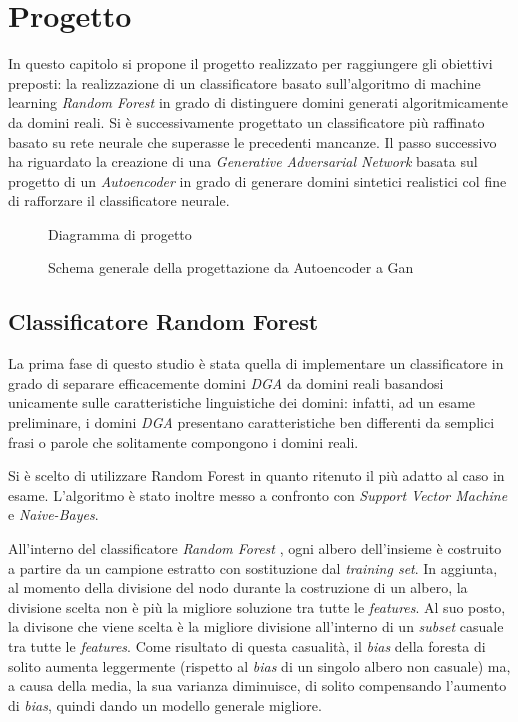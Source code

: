 \chapter{Progetto}
\label{progetto}

In questo capitolo si propone il progetto realizzato per raggiungere gli obiettivi preposti: la realizzazione di un classificatore basato sull'algoritmo di machine learning \textit{Random Forest} in grado di distinguere domini generati algoritmicamente da domini reali. Si è successivamente progettato un classificatore più raffinato basato su rete neurale che superasse le precedenti mancanze. Il passo successivo ha riguardato la creazione di una \textit{Generative Adversarial Network} basata sul progetto di un \textit{Autoencoder} in grado di generare domini sintetici realistici col fine di rafforzare il classificatore neurale.

\begin{figure}[htb]
    \centering
	
\label{fig:intro}
\caption{Diagramma di progetto}
\end{figure}

\begin{figure}[htb]
    \centering
	
\label{fig:auttogan}
\caption{Schema generale della progettazione da Autoencoder a Gan}
\end{figure}

\section{Classificatore Random Forest}
\label{randomforest}
La prima fase di questo studio è stata quella di implementare un classificatore in grado di separare efficacemente domini \textit{DGA} da domini reali basandosi unicamente sulle caratteristiche linguistiche dei domini: infatti, ad un esame preliminare, i domini \textit{DGA} presentano caratteristiche ben differenti da semplici frasi o parole che solitamente compongono i domini reali.

Si è scelto di utilizzare Random Forest in quanto ritenuto il più adatto al caso in esame. L'algoritmo è stato inoltre messo a confronto con \textit{Support Vector Machine} e \textit{Naive-Bayes}. 

All'interno del classificatore \textit{Random Forest} \cite{randomforest}, ogni albero dell'insieme è costruito a partire da un campione estratto con sostituzione dal \textit{training set}. In aggiunta, al momento della divisione del nodo durante la costruzione di un albero, la divisione scelta non è più la migliore soluzione tra tutte le \textit{features}. Al suo posto, la divisone che viene scelta è la migliore divisione all'interno di un \textit{subset} casuale tra tutte le \textit{features}. Come risultato di questa casualità, il \textit{bias} della foresta di solito aumenta leggermente (rispetto al \textit{bias} di un singolo albero non casuale) ma, a causa della media, la sua varianza diminuisce, di solito compensando l'aumento di \textit{bias}, quindi dando un modello generale migliore.

